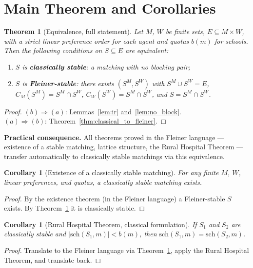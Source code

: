 \documentclass[12pt, a4paper]{article}
\theoremstyle{definition}
\theoremstyle{plain}
\newtheorem{theorem}[definition]{Theorem}
\newtheorem{corollary}[definition]{Corollary}
\theoremstyle{remark}
\newcommand{\CM}{C_M}
\newcommand{\CW}{C_W}
\newcommand{\SM}{S^M}
\newcommand{\SW}{S^W}
\newcommand{\school}[2]{\mathrm{sch}(#1,#2)}
\newcommand{\quota}{b}
\begin{document}
\section{Main Theorem and Corollaries}

\begin{theorem}[Equivalence, full statement]
\label{thm:main_full}
Let $M$, $W$ be finite sets, $E \subseteq M \times W$, with a strict linear
preference order for each agent and quotas $\quota(m)$ for schools.
Then the following conditions on $S \subseteq E$ are equivalent:
\begin{enumerate}[label=(\alph*)]
  \item $S$ is \textbf{classically stable}: a matching with no blocking pair;
  \item $S$ is \textbf{Fleiner-stable}: there exists $(\SM, \SW)$ with
    $\SM \cup \SW = E$, $\CM(\SM) = \SM \cap \SW$, $\CW(\SW) = \SM \cap \SW$,
    and $S = \SM \cap \SW$.
\end{enumerate}
\end{theorem}
\begin{proof}
$(b) \Rightarrow (a)$: Lemmas~\ref{lem:ir} and~\ref{lem:no_block}.\\
$(a) \Rightarrow (b)$: Theorem~\ref{thm:classical_to_fleiner}.
\end{proof}

\begin{greenbox}
\textbf{Practical consequence.}
All theorems proved in the Fleiner language --- existence of a stable matching,
lattice structure, the Rural Hospital Theorem --- transfer automatically to
classically stable matchings via this equivalence.
\end{greenbox}

\begin{corollary}[Existence of a classically stable matching]
For any finite $M$, $W$, linear preferences, and quotas, a classically stable
matching exists.
\end{corollary}
\begin{proof}
By the existence theorem (in the Fleiner language) a Fleiner-stable $S$ exists.
By Theorem~\ref{thm:main_full} it is classically stable.
\end{proof}

\begin{corollary}[Rural Hospital Theorem, classical formulation]
If $S_1$ and $S_2$ are classically stable and $|\school{S_1}{m}| < \quota(m)$,
then $\school{S_1}{m} = \school{S_2}{m}$.
\end{corollary}
\begin{proof}
Translate to the Fleiner language via Theorem~\ref{thm:main_full}, apply the
Rural Hospital Theorem, and translate back.
\end{proof}
\end{document}
